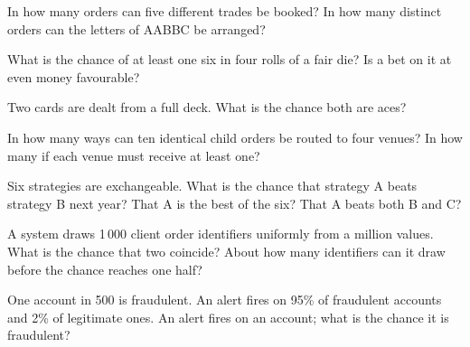 \begin{interviewq}\label{iq:iv:probability-i:1}
In how many orders can five different trades be booked? In how many distinct orders can the letters of AABBC be
arranged?
\end{interviewq}

\begin{interviewq}\label{iq:iv:probability-i:2}
What is the chance of at least one six in four rolls of a fair die? Is a bet on it at even money favourable?
\end{interviewq}

\begin{interviewq}\label{iq:iv:probability-i:3}
Two cards are dealt from a full deck. What is the chance both are aces?
\end{interviewq}

\begin{interviewq}\label{iq:iv:probability-i:4}
In how many ways can ten identical child orders be routed to four venues? In how many if each venue must
receive at least one?
\end{interviewq}

\begin{interviewq}\label{iq:iv:probability-i:5}
Six strategies are exchangeable. What is the chance that strategy A beats strategy B next year? That A is the
best of the six? That A beats both B and C?
\end{interviewq}

\begin{interviewq}\label{iq:iv:probability-i:6}
A system draws 1\,000 client order identifiers uniformly from a million values. What is the chance that two
coincide? About how many identifiers can it draw before the chance reaches one half?
\end{interviewq}

\begin{interviewq}\label{iq:iv:probability-i:7}
One account in 500 is fraudulent. An alert fires on 95\% of fraudulent accounts and 2\% of legitimate ones. An
alert fires on an account; what is the chance it is fraudulent?
\end{interviewq}

